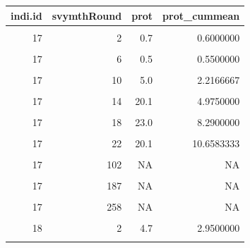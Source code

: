 \documentclass[
]{book}
\begin{document}
\begin{table}[!h]
\centering
\begin{tabular}{r|r|r|r}
\hline
indi.id & svymthRound & prot & prot\_cummean\\
\hline
\cellcolor{gray!6}{17} & \cellcolor{gray!6}{0} & \cellcolor{gray!6}{0.5} & \cellcolor{gray!6}{0.5000000}\\
\hline
17 & 2 & 0.7 & 0.6000000\\
\hline
\cellcolor{gray!6}{17} & \cellcolor{gray!6}{4} & \cellcolor{gray!6}{0.5} & \cellcolor{gray!6}{0.5666667}\\
\hline
17 & 6 & 0.5 & 0.5500000\\
\hline
\cellcolor{gray!6}{17} & \cellcolor{gray!6}{8} & \cellcolor{gray!6}{6.1} & \cellcolor{gray!6}{1.6600000}\\
\hline
17 & 10 & 5.0 & 2.2166667\\
\hline
\cellcolor{gray!6}{17} & \cellcolor{gray!6}{12} & \cellcolor{gray!6}{6.4} & \cellcolor{gray!6}{2.8142857}\\
\hline
17 & 14 & 20.1 & 4.9750000\\
\hline
\cellcolor{gray!6}{17} & \cellcolor{gray!6}{16} & \cellcolor{gray!6}{20.1} & \cellcolor{gray!6}{6.6555556}\\
\hline
17 & 18 & 23.0 & 8.2900000\\
\hline
\cellcolor{gray!6}{17} & \cellcolor{gray!6}{20} & \cellcolor{gray!6}{24.9} & \cellcolor{gray!6}{9.8000000}\\
\hline
17 & 22 & 20.1 & 10.6583333\\
\hline
\cellcolor{gray!6}{17} & \cellcolor{gray!6}{24} & \cellcolor{gray!6}{10.1} & \cellcolor{gray!6}{10.6153846}\\
\hline
17 & 102 & NA & NA\\
\hline
\cellcolor{gray!6}{17} & \cellcolor{gray!6}{138} & \cellcolor{gray!6}{NA} & \cellcolor{gray!6}{NA}\\
\hline
17 & 187 & NA & NA\\
\hline
\cellcolor{gray!6}{17} & \cellcolor{gray!6}{224} & \cellcolor{gray!6}{NA} & \cellcolor{gray!6}{NA}\\
\hline
17 & 258 & NA & NA\\
\hline
\cellcolor{gray!6}{18} & \cellcolor{gray!6}{0} & \cellcolor{gray!6}{1.2} & \cellcolor{gray!6}{1.2000000}\\
\hline
18 & 2 & 4.7 & 2.9500000\\
\hline
\cellcolor{gray!6}{18} & \cellcolor{gray!6}{4} & \cellcolor{gray!6}{17.2} & \cellcolor{gray!6}{7.7000000}\\

\end{tabular}
\end{table}
\end{document}
